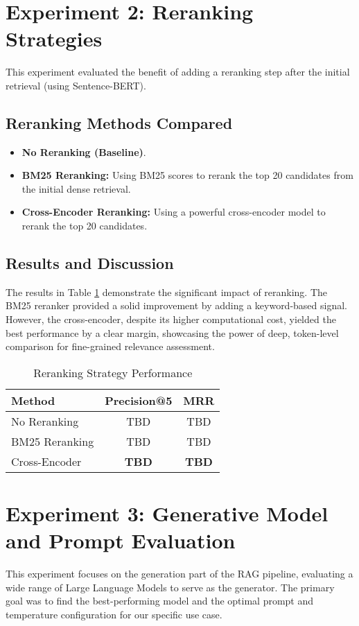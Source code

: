 \section{Experiment 2: Reranking Strategies}
\label{sec:exp_reranking}
This experiment evaluated the benefit of adding a reranking step after the initial retrieval (using Sentence-BERT).
\subsection{Reranking Methods Compared}
\begin{itemize}
    \item \textbf{No Reranking (Baseline)}.
    \item \textbf{BM25 Reranking:} Using BM25 scores to rerank the top 20 candidates from the initial dense retrieval.
    \item \textbf{Cross-Encoder Reranking:} Using a powerful cross-encoder model to rerank the top 20 candidates.
\end{itemize}
\subsection{Results and Discussion}
The results in Table \ref{tab:reranking_results} demonstrate the significant impact of reranking. The BM25 reranker provided a solid improvement by adding a keyword-based signal. However, the cross-encoder, despite its higher computational cost, yielded the best performance by a clear margin, showcasing the power of deep, token-level comparison for fine-grained relevance assessment.

\begin{table}[!htbp]
\centering
\caption{Reranking Strategy Performance}
\label{tab:reranking_results}
\begin{tabular}{|l|c|c|}
\hline
\textbf{Method} & \textbf{Precision@5} & \textbf{MRR} \\
\hline
No Reranking & TBD & TBD \\
BM25 Reranking & TBD & TBD \\
Cross-Encoder & \textbf{TBD} & \textbf{TBD} \\
\hline
\end{tabular}
\end{table}

\section{Experiment 3: Generative Model and Prompt Evaluation}
\label{sec:exp_generator_prompt}
This experiment focuses on the generation part of the RAG pipeline, evaluating a wide range of Large Language Models to serve as the generator. The primary goal was to find the best-performing model and the optimal prompt and temperature configuration for our specific use case.

